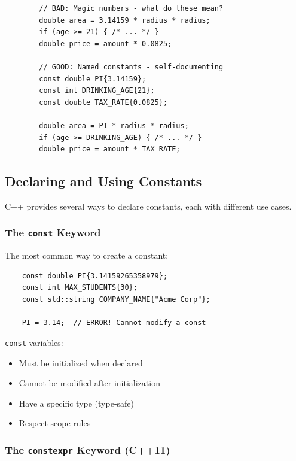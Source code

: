 \begin{example}{\leavevmode}
	
	\begin{lstlisting}
		// BAD: Magic numbers - what do these mean?
		double area = 3.14159 * radius * radius;
		if (age >= 21) { /* ... */ }
		double price = amount * 0.0825;
		
		// GOOD: Named constants - self-documenting
		const double PI{3.14159};
		const int DRINKING_AGE{21};
		const double TAX_RATE{0.0825};
		
		double area = PI * radius * radius;
		if (age >= DRINKING_AGE) { /* ... */ }
		double price = amount * TAX_RATE;
	\end{lstlisting}
\end{example}

\subsection{Declaring and Using Constants}

C++ provides several ways to declare constants, each with different use cases.

\subsubsection{The \texttt{const} Keyword}

The most common way to create a constant:

\begin{lstlisting}
	const double PI{3.14159265358979};
	const int MAX_STUDENTS{30};
	const std::string COMPANY_NAME{"Acme Corp"};
	
	PI = 3.14;  // ERROR! Cannot modify a const
\end{lstlisting}

\texttt{const} variables:
\begin{itemize}
	\item Must be initialized when declared
	\item Cannot be modified after initialization
	\item Have a specific type (type-safe)
	\item Respect scope rules
\end{itemize}

\subsubsection{The \texttt{constexpr} Keyword (C++11)}

